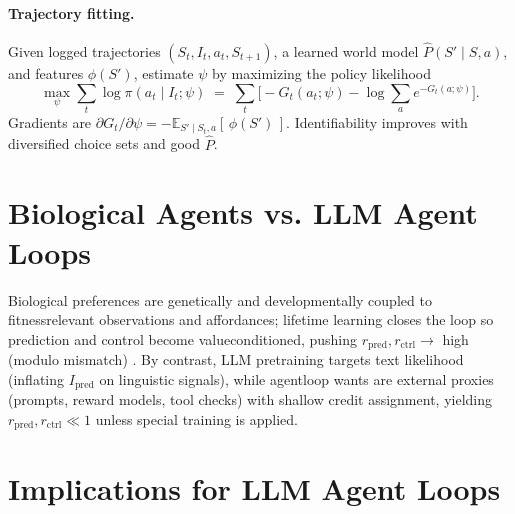 \documentclass[11pt]{article}
\begin{document}
\paragraph{Trajectory fitting.} Given logged trajectories $(S_t,I_t,a_t,S_{t+1})$, a learned world model $\widehat P(S'\mid S,a)$, and features $\phi(S')$, estimate $\psi$ by maximizing the policy likelihood
\begin{equation}
\max_{\psi} \sum_t \log \pi(a_t\mid I_t;\psi) \;=\; \sum_t \Big[-G_t(a_t;\psi) - \log \sum_{a} e^{-G_t(a;\psi)}\Big].
\end{equation}
Gradients are $\partial G_t/\partial \psi = -\mathbb E_{S'\mid S_t,a}[\,\phi(S')\,]$. Identifiability improves with diversified choice sets and good $\widehat P$.

\section{Biological Agents vs. LLM Agent Loops}
\label{sec:bio-vs-llm}
Biological preferences are genetically and developmentally coupled to fitness\textendash relevant observations and affordances; lifetime learning closes the loop so prediction and control become value\textendash conditioned, pushing $r_{\mathrm{pred}}, r_{\mathrm{ctrl}} \to$ high (modulo mismatch) \citep{ZarnckeUAD, ZarnckeBIQ}. By contrast, LLM pretraining targets text likelihood (inflating $I_{\mathrm{pred}}$ on linguistic signals), while agent\textendash loop wants are external proxies (prompts, reward models, tool checks) with shallow credit assignment, yielding $r_{\mathrm{pred}}, r_{\mathrm{ctrl}}\ll 1$ unless special training is applied.

\section{Implications for LLM Agent Loops}
\label{sec:implications}
\end{document}
